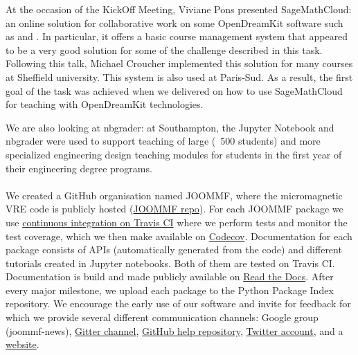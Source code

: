 \documentclass{deliverablereport}
\begin{document}
At the occasion of the KickOff Meeting, Viviane Pons presented SageMathCloud: an online solution for collaborative
work on some OpenDreamKit software such as \Sage and \Jupyter. In particular, it offers a basic course management system that appeared to be a very good solution for some of the challenge described in this task. Following this talk, Michael Croucher implemented this solution for many courses at Sheffield university. This system is also used at Paris-Sud. As a result, the first goal of the task was achieved when we delivered  on how to use SageMathCloud for teaching with OpenDreamKit technologies. 

We are also looking at nbgrader: at Southampton, the Jupyter Notebook and nbgrader were used to support teaching of large (~500 students) and more specialized engineering design teaching modules for students in the first year of their engineering degree programs.

\paragraph{}

We created a GitHub organisation named JOOMMF, where the micromagnetic VRE code is publicly hosted (\href{https://github.com/joommf}{JOOMMF repo}). For each JOOMMF package we use \href{https://travis-ci.org/joommf/discretisedfield}{continuous integration on Travis CI} where we perform tests and monitor the test coverage, which we then make available on \href{https://codecov.io/}{Codecov}. Documentation for each package consists of APIs (automatically generated from the code) and different tutorials created in Jupyter notebooks. Both of them are tested on Travis CI. Documentation is build and made publicly available on \href{http://discretisedfield.readthedocs.io}{Read the Docs}. After every major milestone, we upload each package to the Python Package Index repository. We encourage the early use of our software and invite for feedback for which we provide several different communication channels: Google group (joommf-news), \href{https://gitter.im/joommf/}{Gitter channel}, \href{https://github.com/joommf/help}{GitHub help repository}, \href{https://twitter.com/joommf}{Twitter account}, and a \href{http://joommf.github.io/}{website}.

\paragraph{}
\end{document}
